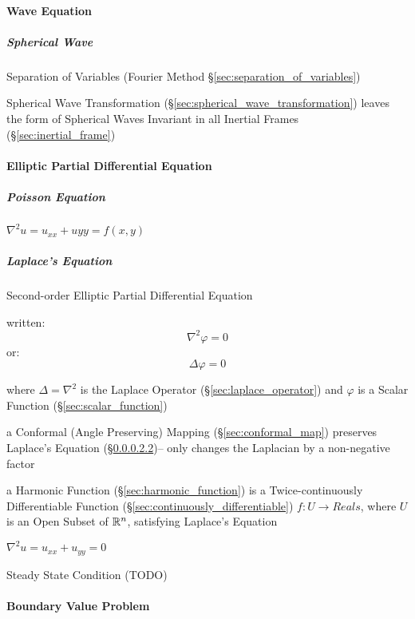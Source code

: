 \paragraph{Wave Equation}\label{sec:dirichlet_problem}\hfill

\subparagraph{Spherical Wave}\label{sec:spherical_wave}\hfill

Separation of Variables (Fourier Method \S\ref{sec:separation_of_variables})

Spherical Wave Transformation (\S\ref{sec:spherical_wave_transformation})
leaves the form of Spherical Waves Invariant in all Inertial Frames
(\S\ref{sec:inertial_frame})



\paragraph{Elliptic Partial Differential Equation}
\label{sec:elliptic_partial_differential}\hfill

\subparagraph{Poisson Equation}\label{sec:poisson_equation}\hfill

$\nabla^2 u = u_{xx} + u{yy} = f(x,y)$



\subparagraph{Laplace's Equation}\label{sec:laplaces_equation}\hfill

Second-order Elliptic Partial Differential Equation

written:
\[ \nabla^2 \varphi = 0 \]
or:
\[ \Delta \varphi = 0 \]

where $\Delta = \nabla^2$ is the Laplace Operator
(\S\ref{sec:laplace_operator}) and $\varphi$ is a Scalar Function
(\S\ref{sec:scalar_function})

a Conformal (Angle Preserving) Mapping (\S\ref{sec:conformal_map}) preserves
Laplace's Equation (\S\ref{sec:laplaces_equation})-- only changes the Laplacian
by a non-negative factor

a Harmonic Function (\S\ref{sec:harmonic_function}) is a Twice-continuously
Differentiable Function (\S\ref{sec:continuously_differentiable}) $f : U
\rightarrow Reals$, where $U$ is an Open Subset of $\mathbb{R}^n$, satisfying
Laplace's Equation

$\nabla^2 u = u_{xx} + u_{yy} = 0$ %

Steady State Condition (TODO)



\paragraph{Boundary Value Problem}\label{sec:boundary_value_problem}\hfill

